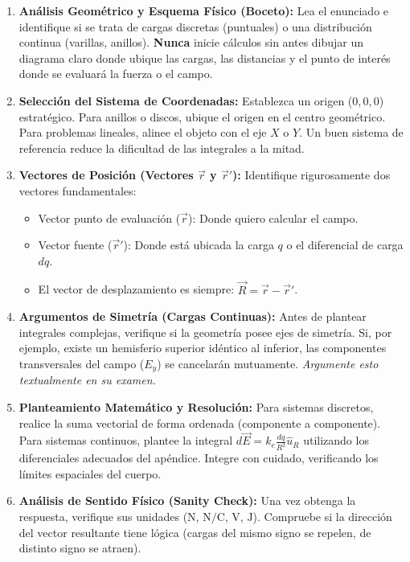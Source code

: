 \documentclass[11pt,twoside]{article}
\newcounter{problema}
\begin{document}
\begin{enumerate}
    \item \textbf{Análisis Geométrico y Esquema Físico (Boceto):} 
    Lea el enunciado e identifique si se trata de cargas discretas (puntuales) o una distribución continua (varillas, anillos). \textbf{Nunca} inicie cálculos sin antes dibujar un diagrama claro donde ubique las cargas, las distancias y el punto de interés donde se evaluará la fuerza o el campo.
    
    \item \textbf{Selección del Sistema de Coordenadas:} 
    Establezca un origen ($0,0,0$) estratégico. Para anillos o discos, ubique el origen en el centro geométrico. Para problemas lineales, alinee el objeto con el eje $X$ o $Y$. Un buen sistema de referencia reduce la dificultad de las integrales a la mitad.
    
    \item \textbf{Vectores de Posición (Vectores $\vec{r}$ y $\vec{r}'$):}
    Identifique rigurosamente dos vectores fundamentales:
    \begin{itemize}
        \item Vector punto de evaluación ($\vec{r}$): Donde quiero calcular el campo.
        \item Vector fuente ($\vec{r}'$): Donde está ubicada la carga $q$ o el diferencial de carga $dq$.
        \item El vector de desplazamiento es siempre: $\vec{R} = \vec{r} - \vec{r}'$.
    \end{itemize}
    
    \item \textbf{Argumentos de Simetría (Cargas Continuas):} 
    Antes de plantear integrales complejas, verifique si la geometría posee ejes de simetría. Si, por ejemplo, existe un hemisferio superior idéntico al inferior, las componentes transversales del campo ($E_y$) se cancelarán mutuamente. \textit{Argumente esto textualmente en su examen.}
    
    \item \textbf{Planteamiento Matemático y Resolución:} 
    Para sistemas discretos, realice la suma vectorial de forma ordenada (componente a componente). Para sistemas continuos, plantee la integral $d\vec{E} = k_e \frac{dq}{R^2} \hat{u}_R$ utilizando los diferenciales adecuados del apéndice. Integre con cuidado, verificando los límites espaciales del cuerpo.
    
    \item \textbf{Análisis de Sentido Físico (Sanity Check):} 
    Una vez obtenga la respuesta, verifique sus unidades ($\text{N}$, $\text{N/C}$, $\text{V}$, $\text{J}$). Compruebe si la dirección del vector resultante tiene lógica (cargas del mismo signo se repelen, de distinto signo se atraen).
\end{enumerate}
\end{document}
